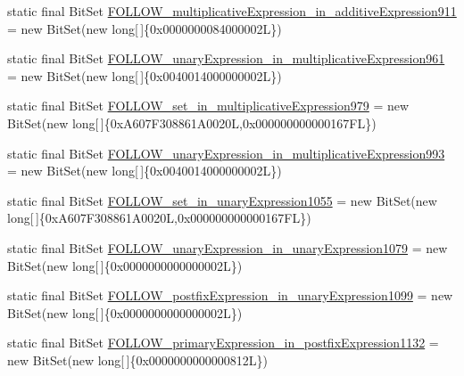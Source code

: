 \begin{DoxyCompactItemize}
\item 
static final Bit\-Set \hyperlink{classorg_1_1tzi_1_1use_1_1parser_1_1ocl_1_1_o_c_l_parser_a703d38bc3eee3c047151577582cb5494}{F\-O\-L\-L\-O\-W\-\_\-multiplicative\-Expression\-\_\-in\-\_\-additive\-Expression911} = new Bit\-Set(new long\mbox{[}$\,$\mbox{]}\{0x0000000084000002\-L\})
\item 
static final Bit\-Set \hyperlink{classorg_1_1tzi_1_1use_1_1parser_1_1ocl_1_1_o_c_l_parser_adea3ae21b83b8c3f41250d7bc79d4631}{F\-O\-L\-L\-O\-W\-\_\-unary\-Expression\-\_\-in\-\_\-multiplicative\-Expression961} = new Bit\-Set(new long\mbox{[}$\,$\mbox{]}\{0x0040014000000002\-L\})
\item 
static final Bit\-Set \hyperlink{classorg_1_1tzi_1_1use_1_1parser_1_1ocl_1_1_o_c_l_parser_a4d533cb1c7207cc3bf0d011fafa6a2ff}{F\-O\-L\-L\-O\-W\-\_\-set\-\_\-in\-\_\-multiplicative\-Expression979} = new Bit\-Set(new long\mbox{[}$\,$\mbox{]}\{0x\-A607\-F308861\-A0020\-L,0x000000000000167\-F\-L\})
\item 
static final Bit\-Set \hyperlink{classorg_1_1tzi_1_1use_1_1parser_1_1ocl_1_1_o_c_l_parser_ac7e974b4c4317559e313aa4092569b74}{F\-O\-L\-L\-O\-W\-\_\-unary\-Expression\-\_\-in\-\_\-multiplicative\-Expression993} = new Bit\-Set(new long\mbox{[}$\,$\mbox{]}\{0x0040014000000002\-L\})
\item 
static final Bit\-Set \hyperlink{classorg_1_1tzi_1_1use_1_1parser_1_1ocl_1_1_o_c_l_parser_acadf8d97583ee205bf94cb6cc2aaa993}{F\-O\-L\-L\-O\-W\-\_\-set\-\_\-in\-\_\-unary\-Expression1055} = new Bit\-Set(new long\mbox{[}$\,$\mbox{]}\{0x\-A607\-F308861\-A0020\-L,0x000000000000167\-F\-L\})
\item 
static final Bit\-Set \hyperlink{classorg_1_1tzi_1_1use_1_1parser_1_1ocl_1_1_o_c_l_parser_a756188557cf370c04ba160a8e6d9d133}{F\-O\-L\-L\-O\-W\-\_\-unary\-Expression\-\_\-in\-\_\-unary\-Expression1079} = new Bit\-Set(new long\mbox{[}$\,$\mbox{]}\{0x0000000000000002\-L\})
\item 
static final Bit\-Set \hyperlink{classorg_1_1tzi_1_1use_1_1parser_1_1ocl_1_1_o_c_l_parser_afda4c62064e8fb05435dc7b72cc91158}{F\-O\-L\-L\-O\-W\-\_\-postfix\-Expression\-\_\-in\-\_\-unary\-Expression1099} = new Bit\-Set(new long\mbox{[}$\,$\mbox{]}\{0x0000000000000002\-L\})
\item 
static final Bit\-Set \hyperlink{classorg_1_1tzi_1_1use_1_1parser_1_1ocl_1_1_o_c_l_parser_a382fbe343ef33c93020ec5cee221be47}{F\-O\-L\-L\-O\-W\-\_\-primary\-Expression\-\_\-in\-\_\-postfix\-Expression1132} = new Bit\-Set(new long\mbox{[}$\,$\mbox{]}\{0x0000000000000812\-L\})

\end{DoxyCompactItemize}
